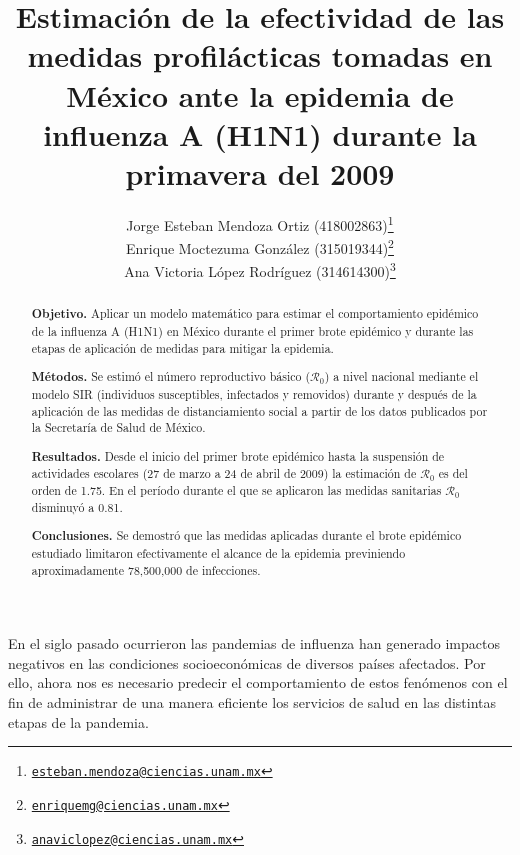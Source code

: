 \documentclass[12pt]{article}
\newcommand{\absdiv}[1]{%
  \par\addvspace{.5\baselineskip}%
  \noindent\textbf{#1}\quad\ignorespaces
}
\begin{document}
	\title{Estimación de la efectividad de las medidas profilácticas tomadas en México ante la epidemia de influenza A (H1N1) durante la primavera del 2009}
	\author{Jorge Esteban Mendoza Ortiz (418002863)\thanks{\href{mailto:esteban.mendoza@ciencias.unam.mx}{\nolinkurl{esteban.mendoza@ciencias.unam.mx}}} \\
	Enrique Moctezuma González (315019344)\thanks{\href{mailto:enriquemg@ciencias.unam.mx}{\nolinkurl{enriquemg@ciencias.unam.mx}}}\\
	Ana Victoria López Rodríguez (314614300)\thanks{\href{anaviclopez@ciencias.unam.mx}{\nolinkurl{anaviclopez@ciencias.unam.mx}}}}
	\date{}
	\maketitle
	
	\begin{abstract}
	\absdiv{Objetivo.} Aplicar un modelo matemático para estimar el comportamiento epidémico de la influenza A (H1N1) en México durante el primer brote epidémico y durante las etapas de aplicación de medidas para mitigar la epidemia.
	
	\absdiv{Métodos.} Se estimó el número reproductivo básico ($\mathcal{R}_0$) a nivel nacional mediante el modelo SIR (individuos susceptibles, infectados y removidos) durante y después de la aplicación de las medidas de distanciamiento social a partir de los datos publicados por la Secretaría de Salud de México.
	
	\absdiv{Resultados.} Desde el inicio del primer brote epidémico hasta la suspensión de actividades escolares (27 de marzo a 24 de abril de 2009) la estimación de $ \mathcal{R}_0 $ es del orden de 1.75. En el período durante el que se aplicaron las medidas sanitarias $ \mathcal{R}_0 $ disminuyó a 0.81.
	
	\absdiv{Conclusiones.} Se demostró que las medidas aplicadas durante el brote epidémico estudiado limitaron efectivamente el alcance de la epidemia previniendo aproximadamente 78,500,000 de infecciones.
	\end{abstract}
	
	\noindent En el siglo pasado ocurrieron las pandemias de influenza han generado impactos negativos en las condiciones socioeconómicas de diversos países afectados. Por ello, ahora nos es necesario predecir el comportamiento de estos fenómenos con el fin de administrar de una manera eficiente los servicios de salud en las distintas etapas de la pandemia. 
	
\end{document}
